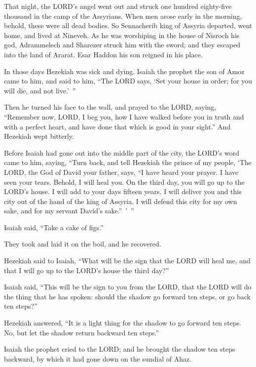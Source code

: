 \myverse{}That night, the LORD’s angel went out and struck one hundred
eighty-five thousand in the camp of the Assyrians. When men arose early in the morning, behold, these
were all dead bodies.
\myverse{}So Sennacherib king of Assyria departed, went home, and lived at Nineveh.
\myverse{}As he was worshiping in the house of Nisroch his god, Adrammelech and Sharezer
struck him with the sword; and they escaped into the land of Ararat. Esar Haddon his son reigned in his
place.


\mychapter{} \myverse*{}In those days Hezekiah was sick and dying. Isaiah the prophet
the son of Amoz came to him, and said to him, “The LORD says, ‘Set your house in order; for you will die,
and not live.’ ”

\myverse{}Then he turned his face to the wall, and prayed to the LORD, saying,
\myverse{}“Remember now, LORD, I beg you, how I have walked before you in truth and with
a perfect heart, and have done that which is good in your sight.” And Hezekiah wept bitterly.

\myverse{}Before Isaiah had gone out into the middle part of the city, the
LORD’s word came to him, saying,
\myverse{}“Turn back, and tell Hezekiah the prince of my people, ‘The LORD, the God of
David your father, says, “I have heard your prayer. I have seen your tears. Behold, I will heal you. On
the third day, you will go up to the LORD’s house.
\myverse{}I will add to your days fifteen years. I will deliver you and this city out
of the hand of the king of Assyria. I will defend this city for my own sake, and for my servant David’s
sake.” ’ ”

\myverse{}Isaiah said, “Take a cake of figs.”

They took and laid it on the boil, and he recovered.

\myverse{}Hezekiah said to Isaiah, “What will be the sign that the LORD
will heal me, and that I will go up to the LORD’s house the third day?”

\myverse{}Isaiah said, “This will be the sign to you from the LORD, that
the LORD will do the thing that he has spoken: should the shadow go forward ten steps, or go back ten
steps?”

\myverse{}Hezekiah answered, “It is a light thing for the shadow to go
forward ten steps. No, but let the shadow return backward ten steps.”

\myverse{}Isaiah the prophet cried to the LORD; and he brought the shadow
ten steps backward, by which it had gone down on the sundial of Ahaz.

